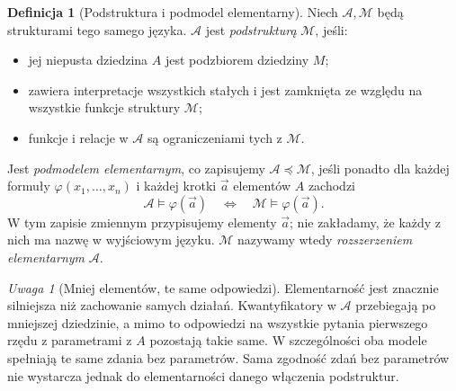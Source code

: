 \documentclass[11pt,a4paper]{article}
\numberwithin{equation}{section}
\theoremstyle{plain}
\theoremstyle{definition}
\newtheorem{definicja}[twierdzenie]{Definicja}
\theoremstyle{remark}
\newtheorem{uwaga}[twierdzenie]{Uwaga}
\begin{document}
\begin{definicja}[Podstruktura i podmodel elementarny]\label{res:14:2}
Niech $\mathcal A,\mathcal M$ będą strukturami tego samego języka. $\mathcal A$ jest \emph{podstrukturą} $\mathcal M$, jeśli:
\begin{itemize}
\item jej niepusta dziedzina $A$ jest podzbiorem dziedziny $M$;
\item zawiera interpretacje wszystkich stałych i jest zamknięta ze względu na wszystkie funkcje struktury $\mathcal M$;
\item funkcje i relacje w $\mathcal A$ są ograniczeniami tych z $\mathcal M$.
\end{itemize}
Jest \emph{podmodelem elementarnym}, co zapisujemy $\mathcal A\preccurlyeq\mathcal M$, jeśli ponadto dla każdej formuły $\varphi(x_1,\ldots,x_n)$ i każdej krotki $\vec a$ elementów $A$ zachodzi
\[
\mathcal A\models\varphi(\vec a)\quad\Longleftrightarrow\quad\mathcal M\models\varphi(\vec a).
\]
W tym zapisie zmiennym przypisujemy elementy $\vec a$; nie zakładamy, że każdy z nich ma nazwę w wyjściowym języku. $\mathcal M$ nazywamy wtedy \emph{rozszerzeniem elementarnym} $\mathcal A$.
\end{definicja}

\begin{uwaga}[Mniej elementów, te same odpowiedzi]\label{res:14:3}
Elementarność jest znacznie silniejsza niż zachowanie samych działań. Kwantyfikatory w $\mathcal A$ przebiegają po mniejszej dziedzinie, a mimo to odpowiedzi na wszystkie pytania pierwszego rzędu z parametrami z $A$ pozostają takie same. W szczególności oba modele spełniają te same zdania bez parametrów. Sama zgodność zdań bez parametrów nie wystarcza jednak do elementarności danego włączenia podstruktur.
\end{uwaga}
\end{document}
